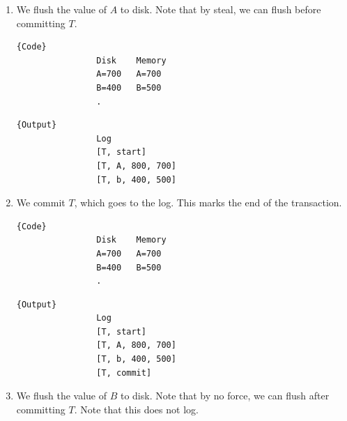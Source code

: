 \documentclass{article}
\begin{document}
\begin{example}
\begin{enumerate}
          \item We flush the value of $A$ to disk. Note that by steal, we can flush before committing $T$.  

            \noindent\begin{minipage}{.46\textwidth}
              \begin{lstlisting}[]{Code}
                Disk    Memory
                A=700   A=700
                B=400   B=500
                .
              \end{lstlisting}
              \end{minipage}
              \hfill
              \begin{minipage}{.45\textwidth}
              \begin{lstlisting}[]{Output}
                Log 
                [T, start]
                [T, A, 800, 700]
                [T, b, 400, 500]
              \end{lstlisting}
            \end{minipage} 

          \item We commit $T$, which goes to the log. This marks the end of the transaction. 

            \noindent\begin{minipage}{.46\textwidth}
              \begin{lstlisting}[]{Code}
                Disk    Memory
                A=700   A=700
                B=400   B=500
                .
              \end{lstlisting}
              \end{minipage}
              \hfill
              \begin{minipage}{.45\textwidth}
              \begin{lstlisting}[]{Output}
                Log 
                [T, start]
                [T, A, 800, 700]
                [T, b, 400, 500] 
                [T, commit]
              \end{lstlisting}
            \end{minipage} 

          \item We flush the value of $B$ to disk. Note that by no force, we can flush after committing $T$. Note that this does not log. 


\end{enumerate}
\end{example}
\end{document}
